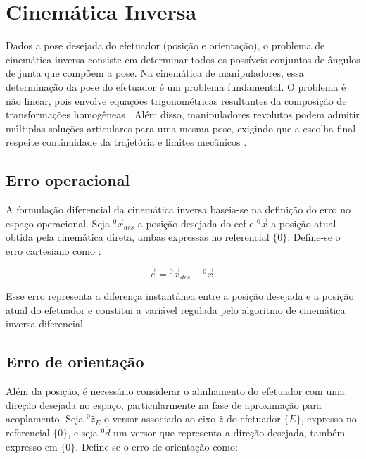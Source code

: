 \section{Cinemática Inversa}
\label{sec_cinematica_inversa}

Dados a pose desejada do efetuador (posição e orientação), o problema de cinemática inversa consiste em determinar todos os possíveis conjuntos de ângulos de junta que compõem a pose.
Na cinemática de manipuladores, essa determinação da pose do efetuador é um problema fundamental.
O problema é não linear, pois envolve equações trigonométricas resultantes da composição de transformações homogêneas \cite{craig2005,spong2006robot}.
Além disso, manipuladores revolutos podem admitir múltiplas soluções articulares para uma mesma pose, exigindo que a escolha final respeite continuidade da trajetória e limites mecânicos \cite{craig2005}.

\subsection{Erro operacional}

A formulação diferencial da cinemática inversa baseia-se na definição do erro no espaço operacional.
Seja ${}^{0}\!\vec{x}_{des}$ a posição desejada do \gls{eef} e ${}^{0}\!\vec{x}$ a posição atual obtida pela cinemática direta, ambas expressas no referencial $\{0\}$.
Define-se o erro cartesiano como \cite{sciavicco_siciliano2010}:

\begin{equation}
\label{eq_erro_operacional}
\vec{e}
=
{}^{0}\!\vec{x}_{des}
-
{}^{0}\!\vec{x}.
\end{equation}

Esse erro representa a diferença instantânea entre a posição desejada e a posição atual do efetuador e constitui a variável regulada pelo algoritmo de cinemática inversa diferencial.


\subsection{Erro de orientação}

Além da posição, é necessário considerar o alinhamento do efetuador com uma direção desejada no espaço, particularmente na fase de aproximação para acoplamento.
Seja ${}^{0}\!\hat{z}_{E}$ o versor associado ao eixo $\hat{z}$ do efetuador $\{E\}$, expresso no referencial $\{0\}$, e seja ${}^{0}\!\hat{d}$ um versor que representa a direção desejada, também expresso em $\{0\}$.
Define-se o erro de orientação como:

